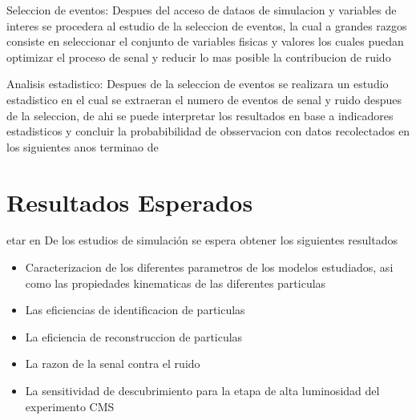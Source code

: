 Seleccion de eventos: Despues del acceso de dataos de simulacion y variables de interes se procedera al estudio de la seleccion de eventos, la cual a grandes razgos consiste en seleccionar el conjunto de variables fisicas y valores los cuales puedan optimizar el proceso de senal y reducir lo mas posible la contribucion de ruido 

Analisis estadistico: Despues de la seleccion de eventos se realizara un estudio estadistico en el cual se extraeran el numero de eventos de senal y ruido despues de la seleccion, de ahi se puede interpretar los resultados en base a indicadores estadisticos y concluir la probabibilidad de obsservacion con datos recolectados en los siguientes anos terminao de


\chapter{Resultados Esperados} 

etar en De los estudios de simulaci\'on se espera obtener los siguientes resultados

\begin{itemize}
\item Caracterizacion de los diferentes parametros de los modelos estudiados, asi como las propiedades kinematicas de las diferentes particulas 
\item Las eficiencias de identificacion de particulas 
\item La eficiencia de reconstruccion de particulas 
\item La razon de la senal contra el ruido 
\item La sensitividad de descubrimiento para la etapa de alta luminosidad del experimento CMS
\end{itemize}




